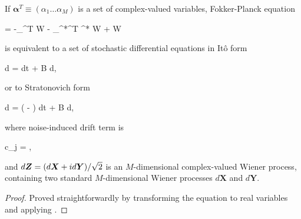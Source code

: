 \begin{theorem}
\label{thm:app-fpe:fpe-sde-complex}
    If $\boldsymbol{\alpha}^T \equiv (\alpha_1 \ldots \alpha_M)$ is a set of complex-valued variables,
    Fokker-Planck equation
    \begin{eqn*}
    	= -\boldsymbol{\partial}_{\boldsymbol{\alpha}}^T  W - \boldsymbol{\partial}_{\boldsymbol{\alpha}^*}^T ^* W
    	+  W
    \end{eqn*}
    is equivalent to a set of stochastic differential equations in It\^{o} form
    \begin{eqn*}
    	d\boldsymbol{\alpha} =  dt + B d\Zvec,
    \end{eqn*}
    or to Stratonovich form
    \begin{eqn*}
    	d\boldsymbol{\alpha} = ( - ) dt + B d\Zvec,
    \end{eqn*}
    where noise-induced drift term is
    \begin{eqn*}
    	c_j = ,
    \end{eqn*}
    and $d\boldsymbol{Z} = (d\boldsymbol{X} + id\boldsymbol{Y}) / \sqrt{2}$ is an $M$-dimensional complex-valued Wiener process,
    containing two standard $M$-dimensional Wiener processes $d\boldsymbol{X}$ and $d\boldsymbol{Y}$.
\end{theorem}
\begin{proof}
Proved straightforwardly by transforming the equation to real variables and applying .
\end{proof}

